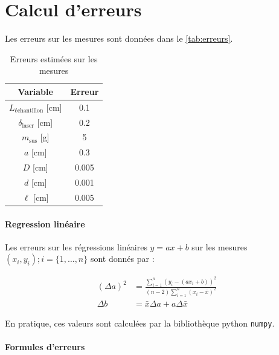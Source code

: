 \section{Calcul d'erreurs}
\label{sec:erreurs}

Les erreurs sur les mesures sont données dans le \autoref{tab:erreurs}.

\begin{table}[h]
    \centering
    \begin{tabulary}{\textwidth}{C C}
        \toprule
        Variable & Erreur \\
        \midrule
        \(L_\textrm{échantillon}\) [\si{\centi\meter}] & 0.1 \\
        \(\delta_\textrm{laser}\) [\si{\centi\meter}] & 0.2 \\
        \(m_\textrm{sus}\) [\si{\gram}] & 5 \\
        \(a\) [\si{\centi\metre}] & 0.3 \\
        \(D\) [\si{\centi\metre}] & 0.005 \\
        \(d\) [\si{\centi\meter}] & 0.001 \\
        \(\ell\) [\si{\centi\meter}] & 0.005 \\
        \bottomrule
    \end{tabulary}
    \caption{Erreurs estimées sur les mesures}
    \label{tab:erreurs}
\end{table}

\paragraph*{Regression linéaire}
Les erreurs sur les régressions linéaires \(y = ax + b\) sur les mesures \((x_i, y_i) ; i = \{1, \dots, n\}\) sont donnés par \cite{erreursmesure}:

\begin{equation}
    \label{eq:erreur:fit}
    \begin{aligned}
        (\Delta a)^2 &= \frac{\sum_{i=1}^{n}(y_i - (a x_i + b))^2}{(n-2) \sum_{i=1}^{n}(x_i - \bar{x})^2}\\
        \Delta b &= \bar{x} \Delta a + a \Delta \bar{x}
    \end{aligned}
\end{equation}

En pratique, ces valeurs sont calculées par la bibliothèque python \texttt{numpy}.

\paragraph*{Formules d'erreurs}

